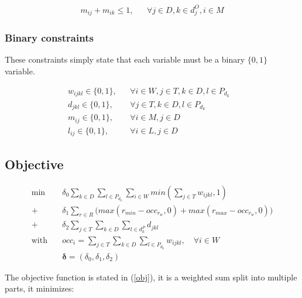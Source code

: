 \documentclass[../../thesis.tex]{subfiles}
\begin{document}
\begin{align}
  m_{ij} + m_{ik} \leq 1, && \forall j \in D, k \in d^O_j, i \in M  
\end{align}


\subsubsection{Binary constraints}

These constraints simply state that each variable must be a binary $\{ 0, 1 \}$ variable.

\begin{align}
  w_{ijkl} \in \{0, 1\}, && \forall i \in W, j \in T, k \in D, l \in P_{d_k} &\label{binary1} \\
  d_{jkl} \in \{0, 1\}, && \forall j \in T, k \in D, l \in P_{d_k}& \label{binary2} \\
  m_{ij} \in \{0, 1\}, && \forall i \in M, j \in D& \label{binary3} \\ 
  l_{ij} \in \{0, 1\}, && \forall i \in L, j \in D& \label{binary4} 
\end{align}




\subsection{Objective}


\begingroup
\allowdisplaybreaks
\begin{subequations}
  \label{obj}
  \begin{align}
    \textrm{min} \quad & \delta_0 \sum_{k \in D} \sum_{l \in  P_{d_k}} \sum_{i \in W} min(\sum_{j \in T} w_{ijkl}, 1) \label{obj:1} \\ 
      + \ & \delta_1 \sum_{r \in R} \big( max(r_{min} - occ_{r_{w}}, 0) + max(r_{max} - occ_{r_{w}}, 0) \big)  \label{obj:3} \\ 
      + \ &\delta_2 \sum_{j \in T}\sum_{k\in D}\sum_{l \in d^P_k} d_{jkl} \label{obj:2} \\ 
     \textrm{with} \quad & occ_i = \sum_{j \in T} \sum_{k \in D} \sum_{l \in  P_{d_k}} w_{ijkl}, \quad \forall i \in W  \nonumber \\ 
                         & \bm{\delta} = (\delta_0, \delta_1, \delta_2) \label{penalties:mip} \nonumber
  \end{align}
\end{subequations}
\endgroup


The objective function is stated in (\ref{obj}), it is a weighted sum split into multiple parts, it minimizes:
\end{document}
